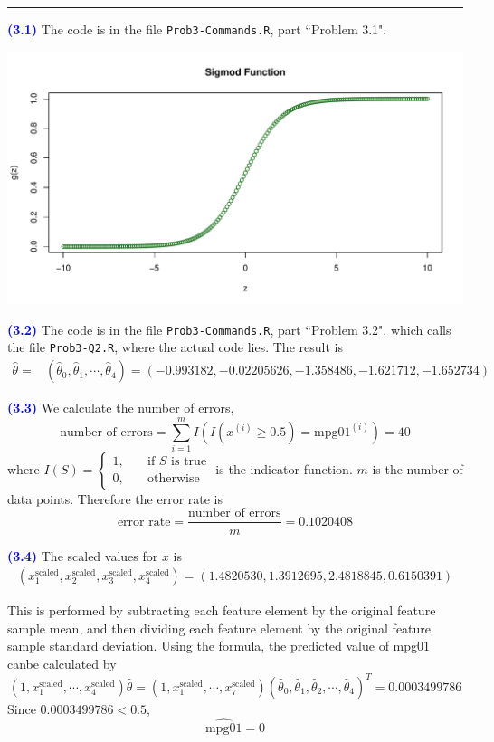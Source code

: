 \documentclass[a4paper,12pt]{article}
\newcommand{\code}[1]{\texttt{#1}}
\newcommand{\qnum}[1]{\noindent\textcolor{blue}{\textbf{(#1)}}}
\newcommand{\tx}[1]{\text{#1}}
\newcommand{\ba}{\[\begin{aligned}}
\newcommand{\ea}{\end{aligned}\]}
\newcommand{\sep}{\begin{center}\textcolor{gray}{\rule{\textwidth}{0.75pt}}\end{center}}
\begin{document}
\sep 


\qnum{3.1}
The code is in the file \code{Prob3-Commands.R}, part ``Problem 3.1".
\begin{center}
    \includegraphics[width=0.9\linewidth]{Images/Prob3-1.pdf}
\end{center}
\bigskip


\qnum{3.2}
The code is in the file \code{Prob3-Commands.R}, part ``Problem 3.2", which calls the file \code{Prob3-Q2.R}, where the actual code lies.
The result is 
\ba 
    \hat\theta
    =& (\hat\theta_0, \hat\theta_1, \cdots, \hat\theta_4)
    = ( -0.993182, -0.02205626, -1.358486, -1.621712, -1.652734 )
\ea 




\qnum{3.3}
We calculate the number of errors, 
\[
    \tx{number of errors} = 
    \sum_{i = 1}^m I(I(x^{(i)}\ge 0.5) = \tx{mpg01}^{(i)}) = 40
\]
where $I(S) = \left\{\begin{aligned}
    1,\quad &\tx{if } S \tx{ is true}\\
    0,\quad &\tx{otherwise}
\end{aligned}\right.$ is the indicator function. $m$ is the number of data points.
Therefore the error rate is 
\[
   \tx{error rate} = \frac{\tx{number of errors}}{m} = 0.1020408
\]
\bigskip


\qnum{3.4}
The scaled values for $x$ is 
\ba 
     (x_1^{\tx{scaled}}, x_2^{\tx{scaled}},x_3^{\tx{scaled}} ,x_4^{\tx{scaled}})
    = (  1.4820530,    1.3912695,    2.4818845,    0.6150391)
\ea 

This is performed by subtracting each feature element by the original feature sample mean, and then dividing each feature element by the original feature sample standard deviation.
Using the formula, the predicted value of mpg01 canbe calculated by
\[
    (1,x_1^{\tx{scaled}},\cdots,x_4^{\tx{scaled}})\hat\theta =  (1,x_1^{\tx{scaled}},\cdots,x_7^{\tx{scaled}})(\hat\theta_0, \hat\theta_1, \hat\theta_2, \cdots, \hat\theta_4)^T
    = 0.0003499786
\]
Since $0.0003499786<0.5$,
\[
    \hat{\tx{mpg01}} = 0
\]
\end{document}
